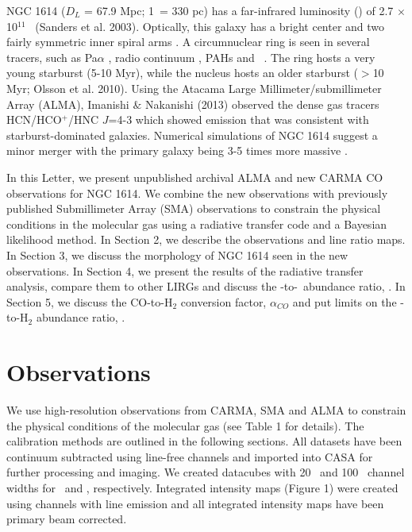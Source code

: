 NGC 1614 ($D_{L}$ = 67.9 Mpc; 1\arcsec\ = 330 pc) has a far-infrared luminosity (\lfir) of 2.7 $\times$ 10$^{11}$ \lsol\ (Sanders et al. 2003)\nocite{Sanders2003}. Optically, this galaxy has a bright center and two fairly symmetric inner spiral arms \citep{Neff1990}. A circumnuclear ring is seen in several tracers, such as Pa$\alpha$ \citep{AlonsoHerrero2001}, radio continuum \citep{Olsson2010}, PAHs \citep{Vaisanen2012} and \cotwo\ \citep{Konig2013}. The ring hosts a very young starburst (5-10 Myr), while the nucleus hosts an older starburst ($>$10 Myr; Olsson et al. 2010).  Using the Atacama Large Millimeter/submillimeter Array (ALMA), Imanishi $\&$ Nakanishi (2013)\nocite{Imanishi2013} observed the dense gas tracers HCN/HCO$^{+}$/HNC $J$=4-3  which showed emission that was consistent with starburst-dominated galaxies. Numerical simulations of NGC 1614 suggest a minor merger with the primary galaxy being 3-5 times more massive \citep{Vaisanen2012}.

In this Letter, we present unpublished archival ALMA and new CARMA CO observations for NGC 1614. We combine the new observations with previously published Submillimeter Array (SMA) observations to constrain the physical conditions in the molecular gas using a radiative transfer code and a Bayesian likelihood method. In Section 2, we describe the observations and line ratio maps. In Section 3, we discuss the morphology of NGC 1614 seen in the new observations. In Section 4, we present the results of the radiative transfer analysis, compare them to other LIRGs and discuss the \co-to-\tco\ abundance ratio, \xco. In Section 5, we discuss the CO-to-H$_{2}$ conversion factor, $\alpha_{CO}$ and put limits on the \co-to-H$_{2}$ abundance ratio, \xh. 



\section{Observations} %
We use high-resolution observations from CARMA, SMA and ALMA to constrain the physical conditions of the molecular gas (see Table 1 for details). The calibration methods are outlined in the following sections. All datasets have been continuum subtracted using line-free channels and imported into CASA for further processing and imaging. We created datacubes with 20 \kms\ and 100 \kms\ channel widths for \co\ and \tco, respectively. Integrated intensity maps (Figure 1) were created using channels with line emission and all integrated intensity maps have been primary beam corrected. 

